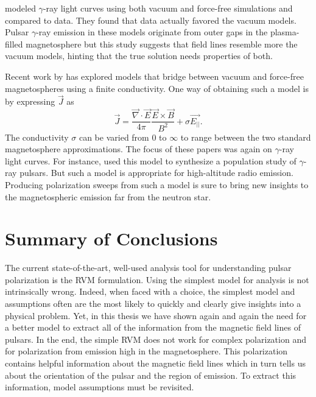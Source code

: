 \cite{harding2011gamma} modeled $\gamma$-ray light curves
using both vacuum and force-free simulations and
compared to data.
They found that data actually favored
the vacuum models.
Pulsar $\gamma$-ray emission in these models originate
from outer gaps in the plasma-filled magnetosphere
but this study suggests that field lines resemble more
the vacuum models, hinting that the true
solution needs properties of both.

Recent work by \cite{kalapotharakos2012gamma,kalapotharakos2012toward,kalapotharakos2014gamma}
has explored models that
bridge between vacuum and force-free magnetospheres using a finite
conductivity.  
One way of obtaining such a model is by expressing $\vec{J}$
as 
\begin{equation}
\vec{J}=\frac{\vec{\nabla}\cdot\vec{E}}{4\pi} \frac{\vec{E}\times\vec{B}}{B^2} + \sigma \vec{E_{||}}.
\end{equation}
The conductivity $\sigma$ can be varied from 0 to $\infty$
to range between the two standard magnetosphere approximations.
The focus of these papers was again on $\gamma$-ray light curves.
For instance, \cite{kalapotharakos2012gamma} used this
model to synthesize a population study of $\gamma$-ray
pulsars.
But such a model is appropriate for high-altitude radio emission.
Producing polarization sweeps from such a model is sure to 
bring new insights to the magnetospheric emission far from the neutron star.


\section{Summary of Conclusions}
\label{sec:finalConclusion}

The current state-of-the-art, well-used analysis
tool for understanding pulsar polarization is 
the RVM formulation.  Using the simplest model
for analysis is not intrinsically wrong.  Indeed,
when faced with a choice, the simplest model and assumptions
often are the most likely to quickly and clearly
give insights into a physical problem.
Yet, in this thesis we have shown again and again 
the need for a better model to extract all of the
information from the magnetic field lines of pulsars.
In the end, the simple RVM does not work for
complex polarization and for polarization from emission
high in the magnetosphere.  This polarization contains
helpful information about the magnetic field lines which
in turn tells us about the orientation of the pulsar
and the region of emission.  To extract this information,
model assumptions must be revisited.

